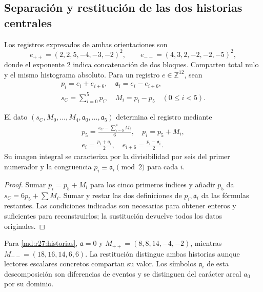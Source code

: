 \subsection{Separación y restitución de las dos historias centrales}
Los registros expresados de ambas orientaciones son
\begin{equation}
 e_{++}=(2,2,5,-4,-3,-2)^2,\qquad
 e_{--}=(4,3,2,-2,-2,-5)^2,
 \label{md:r27:historias}
\end{equation}
donde el exponente $2$ indica concatenación de dos bloques. Comparten total
nulo y el mismo histograma absoluto. Para un registro $e\in\mathbb Z^{12}$,
sean
\begin{equation}
 \begin{gathered}
 p_i=e_i+e_{i+6},\quad \mathfrak a_i=e_i-e_{i+6},\\
 s_C=\sum_{i=0}^{5}p_i,\quad M_i=p_i-p_5\quad(0\le i<5).
 \end{gathered}
 \label{md:r27:registro-electron}
\end{equation}
\begin{proposition}
El dato $(s_C,M_0,\ldots,M_4,\mathfrak a_0,\ldots,\mathfrak a_5)$ determina el registro mediante
\begin{equation}
 \begin{gathered}
 p_5=\frac{s_C-\sum_{i=0}^{4}M_i}{6},\quad p_i=p_5+M_i,\\
 e_i=\frac{p_i+\mathfrak a_i}{2},\quad e_{i+6}=\frac{p_i-\mathfrak a_i}{2}.
 \end{gathered}
 \label{md:r27:inversa-electron}
\end{equation}
Su imagen integral se caracteriza por la divisibilidad por seis del primer
numerador y la congruencia $p_i\equiv \mathfrak a_i\pmod2$ para cada $i$.
\end{proposition}
\begin{proof}
Sumar $p_i=p_5+M_i$ para los cinco primeros índices y añadir $p_5$ da
$s_C=6p_5+\sum M_i$. Sumar y restar las dos definiciones de $p_i,\mathfrak a_i$
da las fórmulas restantes. Las condiciones indicadas son necesarias para
obtener enteros y suficientes para reconstruirlos; la sustitución devuelve
todos los datos originales.
\end{proof}
Para \eqref{md:r27:historias}, $\mathfrak a=0$ y
$M_{++}=(8,8,14,-4,-2)$, mientras $M_{--}=(18,16,14,6,6)$.
La restitución distingue ambas historias aunque lectores escalares concretos
compartan su valor. Los símbolos $\mathfrak a_i$ de esta descomposición son diferencias
de eventos y se distinguen del carácter areal $a_0$ por su dominio.


